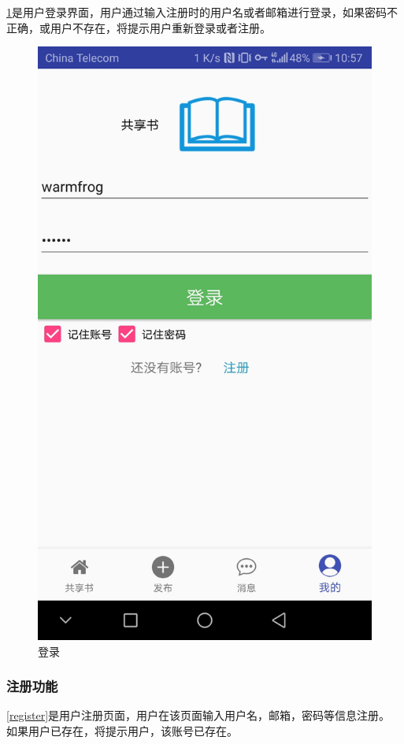 \cref{login}是用户登录界面，用户通过输入注册时的用户名或者邮箱进行登录，如果密码不正确，或用户不存在，将提示用户重新登录或者注册。

\begin{figure}[h]
	\centering
	\includegraphics[scale=0.09]{Chapters/UI/login.jpg}
	\caption{登录}
	\label{login}
\end{figure}



\subsubsection{注册功能}
\cref{register}是用户注册页面，用户在该页面输入用户名，邮箱，密码等信息注册。
如果用户已存在，将提示用户，该账号已存在。

